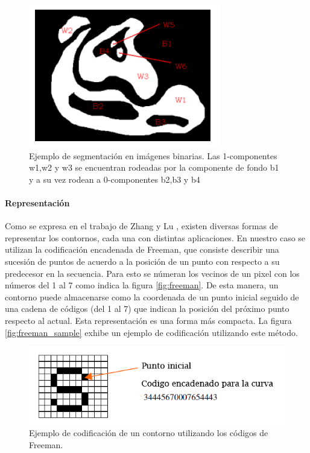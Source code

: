 \begin{figure}[tpb]
\begin{center}
  \includegraphics[scale=0.6]{figuras/zonas-contours.png}
\end{center}
  \caption{\small Ejemplo de segmentación en imágenes binarias. Las 1-componentes w1,w2 y w3 se encuentran rodeadas por la componente de fondo b1 y a su vez
  rodean a 0-componentes b2,b3 y b4 }
  \label{fig:contours}
\end{figure}
	
	
	\paragraph{Representación}
	Como se expresa en el trabajo de Zhang y Lu \cite{Zhang02}, existen diversas formas de representar los contornos, cada una con
	distintas aplicaciones. En nuestro caso se utilizan la codificación encadenada de Freeman, que consiste describir una sucesión de puntos
	de acuerdo a la posición de un punto con respecto a su predecesor en la secuencia. Para esto se númeran los vecinos de un pixel con 
	los números del 1 al 7 como indica la figura \ref{fig:freeman}. De esta manera, un contorno puede almacenarse como la coordenada de
	un punto inicial seguido de una cadena de códigos (del 1 al 7) que indican la posición del próximo punto respecto al actual. Esta 
	representación es una forma más compacta. La figura \ref{fig:freeman_sample} exhibe un 
	ejemplo de codificación utilizando este método.
	
	\begin{figure}[htpb]
\begin{center}
  \includegraphics[scale=0.6]{figuras/freeman-sample.png}
\end{center}	
  \caption{\small Ejemplo de codificación de un contorno utilizando los códigos de Freeman. }
  \label{fig:erode}
\end{figure}

